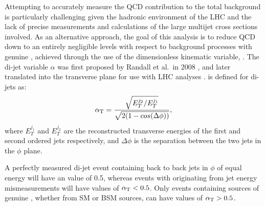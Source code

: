 Attempting to accurately measure the QCD contribution to the total background is
particularly challenging given the hadronic environment of the LHC and the lack
of precise measurements and calculations of the large multijet cross sections
involved. As an
alternative approach, the goal of this analysis is to reduce QCD down to an
entirely negligible levels with respect to background processes with genuine
\met, achieved through the use of the dimensionless kinematic
variable, \alphat. The di-jet variable
$\alpha$ was first proposed by Randall et al.\ in 2008 \cite{Randall:2008rw},
and later translated into the transverse plane for use with LHC analyses
\cite{CMS:2008vya, CMS-PAS-SUS-09-001}.
\alphat is defined for di-jets as:
% 
\begin{equation}
\alpha_{\text{T}} = \frac{ \sqrt{E_T^{j_2}/E_T^{j_1}} }{ \sqrt{2(1-cos(\Delta \phi))} } ,
\label{eq:alphat_di-jet}
\end{equation}
% 
where $E_T^{j_1}$ and $E_T^{j_2}$ are the reconstructed transverse energies of 
the first and second \Pt ordered jets respectively, and $\Delta \phi$ is the separation 
between the two jets in the $\phi$ plane.

A perfectly measured di-jet event containing back to back jets in $\phi$ of equal energy will
have an \alphat value of 0.5, whereas 
events with \met originating from jet energy mismeasurements will have values of $\alpha_{\text{T}}<0.5$.
Only events containing sources of genuine \met, whether from SM or BSM sources,
can have values of $\alpha_{\text{T}} > 0.5$.
% 
% 
% 
% 

